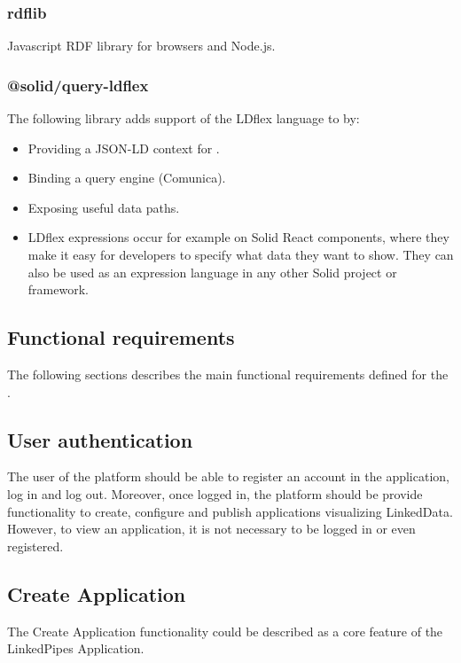 \subsubsection{rdflib}

Javascript RDF library for browsers and Node.js. 

\subsubsection{@solid/query-ldflex}

The following library adds support of the LDflex language to \solid{} by:

\begin{itemize}
	\item Providing a JSON-LD context for \solid{}.
    \item Binding a query engine (Comunica).
    \item Exposing useful data paths.
    \item LDflex expressions occur for example on Solid React components, where they make it easy for developers to specify what data they want to show. They can also be used as an expression language in any other Solid project or framework.
\end{itemize}


\subsection{Functional requirements}

The following sections describes the main functional requirements defined for the \lpa{}. 

\subsection{User authentication}

The user of the platform should be able to register an account in the application, log in and log out. Moreover, once logged in, the platform should be provide functionality to create, configure and publish applications visualizing LinkedData. However, to view an application, it is not necessary to be logged in or even registered.

\subsection{Create Application}

The Create Application functionality could be described as a core feature of the LinkedPipes Application.


